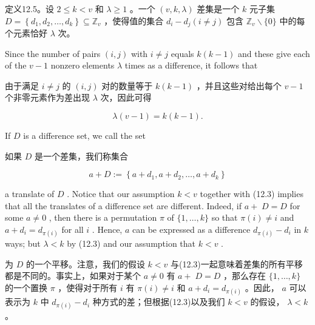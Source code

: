 \documentclass[10pt]{article}
\begin{document}
\begin{tcolorbox}\relax
定义12.5。设 \(2 \leq  k < v\) 和 \(\lambda  \geq  1\) 。一个 \(\left( {v,k,\lambda }\right)\) 差集是一个 \(k\) 元子集 \(D = \left\{  {{d}_{1},{d}_{2},\ldots ,{d}_{k}}\right\}   \subseteq  {\mathbb{Z}}_{v}\) ，使得值的集合 \({d}_{i} - {d}_{j}\left( {i \neq  j}\right)\) 包含 \({\mathbb{Z}}_{v} \smallsetminus  \{ 0\}\) 中的每个元素恰好 \(\lambda\) 次。
\end{tcolorbox}

Since the number of pairs \(\left( {i,j}\right)\) with \(i \neq  j\) equals \(k\left( {k - 1}\right)\) and these give each of the \(v - 1\) nonzero elements \(\lambda\) times as a difference, it follows that

\begin{tcolorbox}\relax
由于满足 \(i \neq  j\) 的 \(\left( {i,j}\right)\) 对的数量等于 \(k\left( {k - 1}\right)\) ，并且这些对给出每个 \(v - 1\) 个非零元素作为差出现 \(\lambda\) 次，因此可得
\end{tcolorbox}

\[
\lambda \left( {v - 1}\right)  = k\left( {k - 1}\right) . \tag{12.3}
\]

If \(D\) is a difference set, we call the set

\begin{tcolorbox}\relax
如果 \(D\) 是一个差集，我们称集合
\end{tcolorbox}

\[
a + D \mathrel{\text{ := }} \left\{  {a + {d}_{1},a + {d}_{2},\ldots ,a + {d}_{k}}\right\}
\]

a translate of \(D\) . Notice that our assumption \(k < v\) together with (12.3) implies that all the translates of a difference set are different. Indeed, if \(a + \; D = D\) for some \(a \neq  0\) , then there is a permutation \(\pi\) of \(\{ 1,\ldots ,k\}\) so that \(\pi \left( i\right)  \neq  i\) and \(a + {d}_{i} = {d}_{\pi \left( i\right) }\) for all \(i\) . Hence, \(a\) can be expressed as a difference \({d}_{\pi \left( i\right) } - {d}_{i}\) in \(k\) ways; but \(\lambda  < k\) by (12.3) and our assumption that \(k < v\) .

\begin{tcolorbox}\relax
为 \(D\) 的一个平移。注意，我们的假设 \(k < v\) 与(12.3)一起意味着差集的所有平移都是不同的。事实上，如果对于某个 \(a \neq  0\) 有 \(a + \; D = D\) ，那么存在 \(\{ 1,\ldots ,k\}\) 的一个置换 \(\pi\) ，使得对于所有 \(i\) 有 \(\pi \left( i\right)  \neq  i\) 和 \(a + {d}_{i} = {d}_{\pi \left( i\right) }\) 。因此， \(a\) 可以表示为 \(k\) 中 \({d}_{\pi \left( i\right) } - {d}_{i}\) 种方式的差；但根据(12.3)以及我们 \(k < v\) 的假设， \(\lambda  < k\) 。
\end{tcolorbox}
\end{document}
